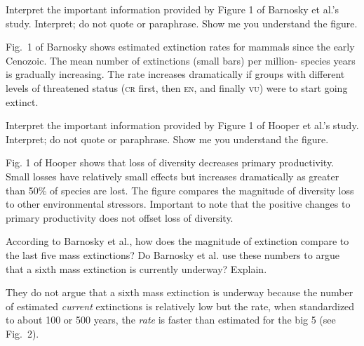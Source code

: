 \documentclass[12pt, addpoints]{exam}
\begin{document}
\begin{questions}

\question[5]
 Interpret the important information provided by Figure 1 of Barnosky et 
  al.'s study. Interpret; do not quote or paraphrase. Show me you
  understand the figure.
  
\ifprintanswers
  \begin{solution}
  	Fig.~1 of Barnosky shows estimated extinction rates for mammals since the early
  	Cenozoic. The mean number of extinctions (small bars) per million-
  	species years is gradually increasing. The rate increases dramatically
  	if groups with different levels of threatened status (\textsc{cr} first,
  	then \textsc{en}, and finally \textsc{vu}) 
  	were to start going extinct.
  \end{solution}
\else
{}
\fi

\question[5]
Interpret the important information provided by Figure 1 of Hooper et
  al.'s study. Interpret; do not quote or paraphrase. Show me you
  understand the figure.
  
\ifprintanswers
  \begin{solution}
  	Fig. 1 of Hooper shows that loss of diversity decreases
  	primary productivity. Small losses have relatively small effects
  	but increases dramatically as greater than 50\% of species are lost.
  	The figure compares the magnitude of diversity loss to other 
  	environmental stressors. Important to note that the positive
  	changes to primary productivity does not offset loss of diversity.
  \end{solution}
\else
{}
\fi

\question[5]
According to Barnosky et al., how does the magnitude of extinction compare to the last five mass extinctions? Do
  Barnosky et al. use these numbers to argue that a sixth mass
  extinction is currently underway? Explain.
  
 \ifprintanswers
 	\begin{solution}
  	They do not argue that a sixth mass extinction is underway because the
  	number of estimated \emph{current} extinctions is relatively 
  	low but the rate, when standardized to about 100 or 500 years,
  	the \emph{rate} is faster than estimated for the big 5 (see Fig.~2).
	\end{solution}
\else
\fi



\end{questions}
\end{document}
